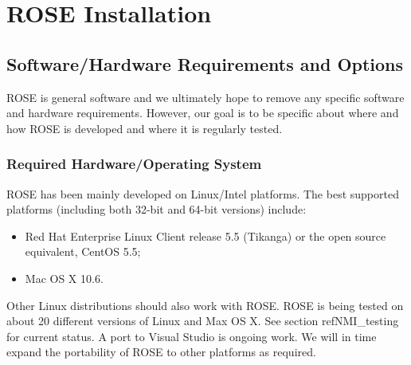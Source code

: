 \section{ROSE Installation}

\subsection{Software/Hardware Requirements and Options}
\label{Requirements_Installation_Testing}
   ROSE is general software and we ultimately hope to remove any specific software
and hardware requirements.  However, our goal is to be specific about where and 
how ROSE is developed and where it is regularly tested.

\subsubsection{Required Hardware/Operating System}

ROSE has been mainly developed on Linux/Intel platforms. 
The best supported platforms (including both 32-bit and 64-bit versions) include:
\begin{itemize}
\item Red Hat Enterprise Linux Client release 5.5 (Tikanga) or the
open source equivalent, CentOS 5.5;  
\item Mac OS X 10.6.
\end{itemize}


Other Linux distributions should also work with ROSE.
ROSE is being tested on about 20 different versions of Linux and Max OS X.
See section ref{NMI\_testing} for current status. 
A port to Visual Studio is ongoing work.
We will in time expand the portability of ROSE to other platforms as
required.


